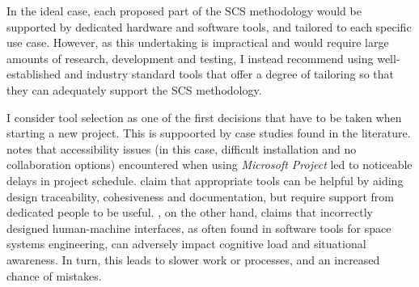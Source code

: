 \documentclass[a4paper,nobib,justified,final]{tufte-book}
\begin{document}
In the ideal case, each proposed part of the \ac{SCS} methodology would be supported by dedicated hardware and software tools, and tailored to each specific use case.
However, as this undertaking is impractical and would require large amounts of research, development and testing, I instead recommend using well-established and industry standard tools that offer a degree of tailoring so that they can adequately support the \ac{SCS} methodology.

I consider tool selection as one of the first decisions that have to be taken when starting a new project.
This is suppoorted by case studies found in the literature.
\citeauthor{garrettProjectManagementSystems2022} \autocite{garrettProjectManagementSystems2022} notes that accessibility issues (in this case, difficult installation and no collaboration options) encountered when using \emph{Microsoft Project} led to noticeable delays in project schedule.
\citeauthor{honore-livermoreManagingProductDevelopment2021} \autocite{honore-livermoreManagingProductDevelopment2021} claim that appropriate tools can be helpful by aiding design traceability, cohesiveness and documentation, but require support from dedicated people to be useful.
\citeauthor{eilertsenOpenSpace2025} \autocite{eilertsenOpenSpace2025}, on the other hand, claims that incorrectly designed human-machine interfaces, as often found in software tools for space systems engineering, can adversely impact cognitive load and situational awareness. In turn, this leads to slower work or processes, and an increased chance of mistakes.

\end{document}
